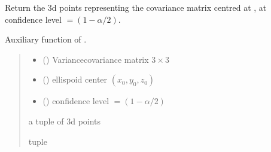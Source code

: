 \documentclass[letterpaper,10pt,english]{sphinxmanual}
\begin{document}
\begin{fulllineitems}
\label{\detokenize{cubmods:cubmods.general.get_cov_ellipsoid}}
\pysigstartsignatures
{}
\pysigstopsignatures
\sphinxAtStartPar
Return the 3d points representing the covariance matrix
 centred at , at confidence level \(=(1 - \alpha/2)\).

\sphinxAtStartPar
Auxiliary function of .
\begin{quote}\begin{description}
\begin{itemize}
\item {} 
\sphinxAtStartPar
{} () \textendash{} Variance\sphinxhyphen{}covariance matrix \(3 \times 3\)

\item {} 
\sphinxAtStartPar
{} () \textendash{} ellispoid center \((x_0, y_0, z_0)\)

\item {} 
\sphinxAtStartPar
{} () \textendash{} confidence level \(=(1 - \alpha/2)\)

\end{itemize}

\sphinxAtStartPar
a tuple of 3d points 

\sphinxAtStartPar
tuple

\end{description}\end{quote}

\end{fulllineitems}

\end{document}
